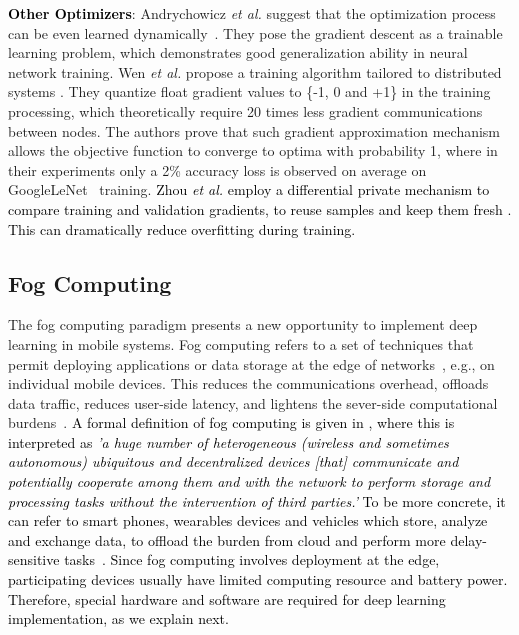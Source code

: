 \documentclass[journal,comsoc,letter]{IEEEtran}
\newcommand{\edit}[1]{\textcolor{black}{#1}}
\newcommand{\rev}[1]{\textcolor{black}{#1}}
\begin{document}
\edit{\textbf{Other Optimizers}}: Andrychowicz \emph{et al.} suggest that the optimization process can be even learned dynamically~\cite{andrychowicz2016learning}. They pose the gradient descent as a trainable learning problem, which demonstrates good generalization ability in neural network training. Wen \emph{et al.} propose a training algorithm tailored to distributed systems \cite{wen2017terngrad}. They quantize float gradient values to \{-1, 0 and +1\} in the training processing, which theoretically require 20 times less gradient communications between nodes. The authors prove that such gradient approximation mechanism allows the objective function to converge to optima with probability 1, where in their experiments only a 2\% accuracy loss is observed on average on GoogleLeNet~\cite{szegedy2015going} training. \edit{Zhou \emph{et al.} employ a differential private mechanism to compare training and validation gradients, to reuse samples and keep them fresh \cite{stable2018zhou}. This can dramatically reduce overfitting during training.}

\subsection{Fog Computing}
The fog computing paradigm presents a new opportunity to implement deep learning in mobile systems. Fog computing refers to a set of techniques that permit deploying applications or data storage at the edge of networks~\cite{bonomi2014fog}, e.g., on individual mobile devices. This reduces the communications overhead, offloads data traffic, reduces user-side latency, and lightens the sever-side computational burdens~\cite{mao2017modnn, mukherjee2018survey}. \edit{A formal definition of fog computing is given in \cite{vaquero2014finding}, where this is interpreted as \emph{'a  huge  number  of  heterogeneous  (wireless  and  sometimes  autonomous) ubiquitous and decentralized devices [that] communicate and potentially cooperate among them and with the network to perform storage and processing tasks without the intervention of third parties.'} To be more concrete, it can refer to smart phones, wearables devices and vehicles which store, analyze and exchange data, to offload the burden from cloud and perform more delay-sensitive tasks~\rev{\cite{aazam2018offloading, Buyya2018Manifesto}}. Since fog computing involves deployment at the edge, participating devices usually have limited computing resource and battery power. Therefore, special hardware and software are required for deep learning implementation, as we explain next.}
\end{document}
